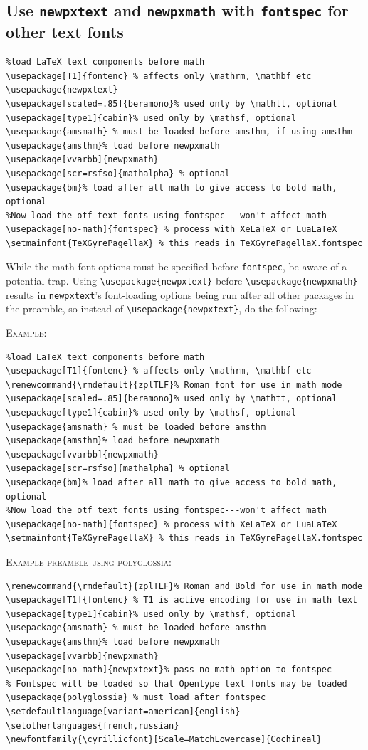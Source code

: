 \documentclass[11pt]{article}
\theoremstyle{oldplain}
\theoremstyle{plain}
\begin{document}
\subsection{Use {\tt newpxtext} and {\tt newpxmath} with {\tt fontspec} for other text fonts}
\begin{verbatim}
%load LaTeX text components before math
\usepackage[T1]{fontenc} % affects only \mathrm, \mathbf etc
\usepackage{newpxtext}
\usepackage[scaled=.85]{beramono}% used only by \mathtt, optional
\usepackage[type1]{cabin}% used only by \mathsf, optional
\usepackage{amsmath} % must be loaded before amsthm, if using amsthm
\usepackage{amsthm}% load before newpxmath
\usepackage[vvarbb]{newpxmath}
\usepackage[scr=rsfso]{mathalpha} % optional
\usepackage{bm}% load after all math to give access to bold math, optional
%Now load the otf text fonts using fontspec---won't affect math
\usepackage[no-math]{fontspec} % process with XeLaTeX or LuaLaTeX
\setmainfont{TeXGyrePagellaX} % this reads in TeXGyrePagellaX.fontspec
\end{verbatim}

While the math font options must be specified before {\tt fontspec}, be aware of a potential trap. Using \verb|\usepackage{newpxtext}| before \verb|\usepackage{newpxmath}| results in {\tt newpxtext}'s font-loading options being run after all other packages in the preamble, so instead of \verb|\usepackage{newpxtext}|, do the following:

\textsc{Example:}
\begin{verbatim}
%load LaTeX text components before math
\usepackage[T1]{fontenc} % affects only \mathrm, \mathbf etc
\renewcommand{\rmdefault}{zplTLF}% Roman font for use in math mode
\usepackage[scaled=.85]{beramono}% used only by \mathtt, optional
\usepackage[type1]{cabin}% used only by \mathsf, optional
\usepackage{amsmath} % must be loaded before amsthm
\usepackage{amsthm}% load before newpxmath
\usepackage[vvarbb]{newpxmath}
\usepackage[scr=rsfso]{mathalpha} % optional
\usepackage{bm}% load after all math to give access to bold math, optional
%Now load the otf text fonts using fontspec---won't affect math
\usepackage[no-math]{fontspec} % process with XeLaTeX or LuaLaTeX
\setmainfont{TeXGyrePagellaX} % this reads in TeXGyrePagellaX.fontspec
\end{verbatim}

\textsc{Example preamble using polyglossia:}

\begin{verbatim}
\renewcommand{\rmdefault}{zplTLF}% Roman and Bold for use in math mode
\usepackage[T1]{fontenc} % T1 is active encoding for use in math text
\usepackage[type1]{cabin}% used only by \mathsf, optional
\usepackage{amsmath} % must be loaded before amsthm
\usepackage{amsthm}% load before newpxmath
\usepackage[vvarbb]{newpxmath}
\usepackage[no-math]{newpxtext}% pass no-math option to fontspec
% Fontspec will be loaded so that Opentype text fonts may be loaded
\usepackage{polyglossia} % must load after fontspec
\setdefaultlanguage[variant=american]{english}
\setotherlanguages{french,russian}
\newfontfamily{\cyrillicfont}[Scale=MatchLowercase]{Cochineal}
\end{verbatim}
\fi
\end{document}
